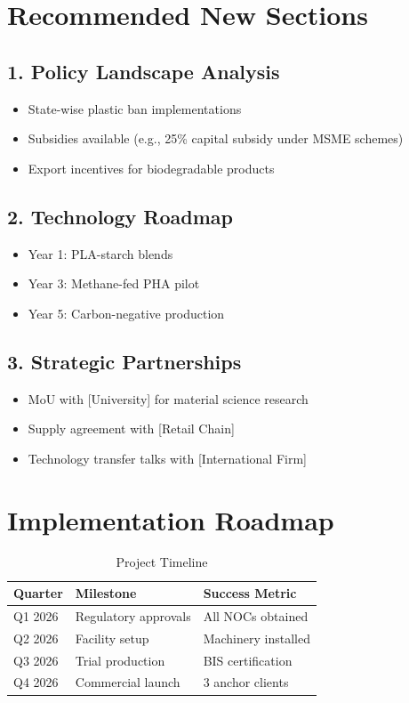 \section*{Recommended New Sections}

\subsection*{1. Policy Landscape Analysis}
\begin{itemize}
\item State-wise plastic ban implementations
\item Subsidies available (e.g., 25\% capital subsidy under MSME schemes)
\item Export incentives for biodegradable products
\end{itemize}

\subsection*{2. Technology Roadmap}
\begin{itemize}
\item Year 1: PLA-starch blends
\item Year 3: Methane-fed PHA pilot
\item Year 5: Carbon-negative production
\end{itemize}

\subsection*{3. Strategic Partnerships}
\begin{itemize}
\item MoU with [University] for material science research
\item Supply agreement with [Retail Chain]
\item Technology transfer talks with [International Firm]
\end{itemize}

\section*{Implementation Roadmap}

\begin{table}[h]
\centering
\caption{Project Timeline}
\begin{tabular}{|l|l|l|}
\hline
\textbf{Quarter} & \textbf{Milestone} & \textbf{Success Metric} \\ \hline
Q1 2026 & Regulatory approvals & All NOCs obtained \\ \hline
Q2 2026 & Facility setup & Machinery installed \\ \hline
Q3 2026 & Trial production & BIS certification \\ \hline
Q4 2026 & Commercial launch & 3 anchor clients \\ \hline
\end{tabular}
\end{table}


